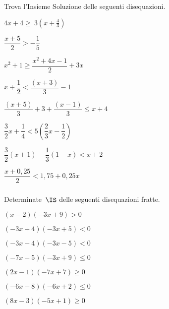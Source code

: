 \begin{esercizio}[\Ast]
 \label{ese:dis_14}
Trova l'Insieme Soluzione delle seguenti disequazioni.
 \begin{multicols}{2}
 \begin{enumeratea}
\item $4x+4\ge~3\left(x+\frac{4}{3}\right)$
\item $\dfrac{x+5}{2}>-{\dfrac{1}{5}}$
\item $x^2+1\ge\dfrac{x^2+4x-1}{2}+3x$
\item $x+\dfrac{1}{2}<\dfrac{(x+3)}{3}-1$
\item $\dfrac{(x+5)}{3}+3+\dfrac{(x-1)}{3}\le x+4$
\item $\dfrac{3}{2}x+\dfrac{1}{4}<5\left(\dfrac{2}{3}x-\dfrac{1}{2}\right)$
\item $\dfrac{3}{2}(x+1)-\dfrac{1}{3}(1-x)<x+2$
\item $\dfrac{x+0,25}{2}<1,75+0,25x$
\end{enumeratea}
\end{multicols}
\end{esercizio}

\subsubsection*{}


\begin{esercizio}[]
\label{ese:dis_}
Determinate~$\IS$ delle seguenti disequazioni fratte.
\begin{multicols}{2}
\begin{enumeratea}
\spazielenx
\item $(x-2)(-3x+9)>0$
\item $(-3x+4)(-3x+5)<0$
\item $(-3x-4)(-3x-5)<0$
\item $(-7x-5)(-3x+9)\le0$
\item $(2x-1)(-7x+7)\ge0$
\item $(-6x-8)(-6x+2)\le0$
\item $(8x-3)(-5x+1)\ge0$
\end{enumeratea}
\end{multicols}
\end{esercizio}

